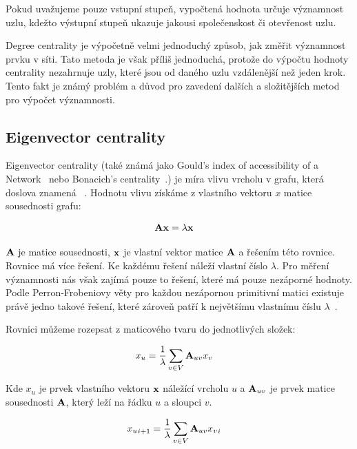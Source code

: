 \documentclass{bakalarka}
\begin{document}
Pokud uvažujeme pouze vstupní stupeň, vypočtená hodnota určuje významnost uzlu,
kdežto výstupní stupeň ukazuje jakousi společenskost či otevřenost uzlu. 

Degree centrality je výpočetně velmi jednoduchý způsob, jak změřit významnost
prvku v síti. Tato metoda je však příliš jednoduchá, protože do výpočtu hodnoty
centrality nezahrnuje uzly, které jsou od daného uzlu vzdálenější než jeden
krok. Tento fakt je známý problém a důvod pro zavedení dalších a složitějších
metod pro výpočet významnosti.



\subsection{Eigenvector centrality}
Eigenvector centrality (také známá jako Gould's index of accessibility of a
Network~\citep{williams2007} nebo Bonacich's
centrality~\citep{hannemanriddle2005}.) je míra vlivu vrcholu v grafu, která
doslova znamená ~\citep{zweigiyengar2010}. Hodnotu vlivu získáme z vlastního vektoru
$x$ matice sousednosti grafu:

\begin{align*}
{\bf Ax} &= \lambda {\bf x}
\end{align*}

${\bf A}$ je matice sousednosti, ${\bf x}$ je vlastní vektor matice ${\bf A}$ a
řešením této rovnice. Rovnice má více řešení. Ke každému řešení náleží vlastní
číslo $\lambda$. Pro měření významnosti nás však zajímá pouze to řešení, které
má pouze nezáporné hodnoty. Podle Perron-Frobeniovy věty pro každou nezápornou
primitivní matici existuje právě jedno takové řešení, které zároveň patří k
největšímu vlastnímu číslu $\lambda$~\citep{langvillemeyer}.

Rovnici můžeme rozepsat z maticového tvaru do jednotlivých složek:

\begin{align*} 
x_u &=  \frac{1}{\lambda} \displaystyle\sum_{v \in V} {\bf A}_{uv} x_v 
\end{align*} 

Kde $x_u$ je prvek vlastního vektoru ${\bf x}$
náležící vrcholu $u$ a ${\bf A}_{uv}$ je prvek matice sousednosti ${\bf A}$,
který leží na řádku $u$ a sloupci $v$.

\begin{align*} 
{x_u}_{i + 1} &=  \frac{1}{\lambda} \displaystyle\sum_{v \in V} {\bf A}_{uv}
{x_v}_{i}
\end{align*} 
\end{document}
